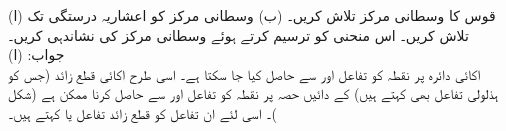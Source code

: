 %
(ا) قوس  کا وسطانی مرکز تلاش کریں۔ (ب) وسطانی مرکز کو اعشاریہ درستگی تک تلاش کریں۔ اس منحنی کو ترسیم کرتے ہوئے وسطانی مرکز کی نشاندہی کریں۔\\
جواب:\quad
(ا)  
\\
اکائی دائرہ پر نقطہ  کو تفاعل  اور سے حاصل کیا جا سکتا ہے۔ اسی طرح اکائی قطع زائد (جس کو ہذلولی تفاعل بھی کہتے ہیں) کے دائیں حصہ پر نقطہ  کو تفاعل  اور  سے حاصل کرنا ممکن ہے (شکل )۔ اسی لئے ان تفاعل کو قطع زائد تفاعل یا  کہتے ہیں۔ 

